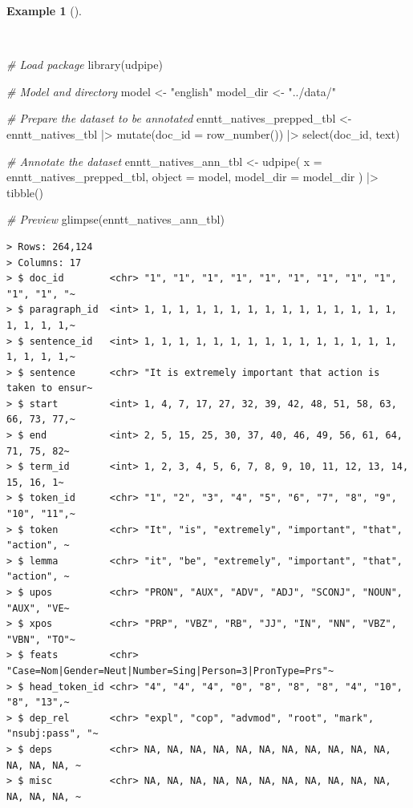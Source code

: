 \documentclass[
  letterpaper,
  DIV=11,
  numbers=noendperiod]{scrreprt}
\newenvironment{Shaded}{\begin{snugshade}}{\end{snugshade}}
\newcommand{\AttributeTok}[1]{\textcolor[rgb]{0.00,0.00,0.00}{#1}}
\newcommand{\CommentTok}[1]{\textcolor[rgb]{0.00,0.00,0.00}{\textit{#1}}}
\newcommand{\FunctionTok}[1]{\textcolor[rgb]{0.00,0.00,0.00}{#1}}
\newcommand{\NormalTok}[1]{\textcolor[rgb]{0.00,0.00,0.00}{#1}}
\newcommand{\OtherTok}[1]{\textcolor[rgb]{0.00,0.00,0.00}{#1}}
\newcommand{\SpecialCharTok}[1]{\textcolor[rgb]{0.00,0.00,0.00}{#1}}
\newcommand{\StringTok}[1]{\textcolor[rgb]{0.00,0.00,0.00}{#1}}
\theoremstyle{definition}
\newtheorem{example}{Example}[chapter]
\theoremstyle{remark}
\begin{document}
\begin{example}[]\protect\hypertarget{exm-td-generation-udpipe-natives}{}\label{exm-td-generation-udpipe-natives}

~

\begin{Shaded}
\begin{Highlighting}[]
\CommentTok{\# Load package}
\FunctionTok{library}\NormalTok{(udpipe)}

\CommentTok{\# Model and directory}
\NormalTok{model }\OtherTok{\textless{}{-}} \StringTok{"english"}
\NormalTok{model\_dir }\OtherTok{\textless{}{-}} \StringTok{"../data/"}

\CommentTok{\# Prepare the dataset to be annotated}
\NormalTok{enntt\_natives\_prepped\_tbl }\OtherTok{\textless{}{-}}
\NormalTok{  enntt\_natives\_tbl }\SpecialCharTok{|\textgreater{}}
  \FunctionTok{mutate}\NormalTok{(}\AttributeTok{doc\_id =} \FunctionTok{row\_number}\NormalTok{()) }\SpecialCharTok{|\textgreater{}}
  \FunctionTok{select}\NormalTok{(doc\_id, text)}

\CommentTok{\# Annotate the dataset}
\NormalTok{enntt\_natives\_ann\_tbl }\OtherTok{\textless{}{-}}
  \FunctionTok{udpipe}\NormalTok{(}
    \AttributeTok{x =}\NormalTok{ enntt\_natives\_prepped\_tbl,}
    \AttributeTok{object =}\NormalTok{ model,}
    \AttributeTok{model\_dir =}\NormalTok{ model\_dir}
\NormalTok{  ) }\SpecialCharTok{|\textgreater{}}
  \FunctionTok{tibble}\NormalTok{()}

\CommentTok{\# Preview}
\FunctionTok{glimpse}\NormalTok{(enntt\_natives\_ann\_tbl)}
\end{Highlighting}
\end{Shaded}

\begin{verbatim}
> Rows: 264,124
> Columns: 17
> $ doc_id        <chr> "1", "1", "1", "1", "1", "1", "1", "1", "1", "1", "1", "~
> $ paragraph_id  <int> 1, 1, 1, 1, 1, 1, 1, 1, 1, 1, 1, 1, 1, 1, 1, 1, 1, 1, 1,~
> $ sentence_id   <int> 1, 1, 1, 1, 1, 1, 1, 1, 1, 1, 1, 1, 1, 1, 1, 1, 1, 1, 1,~
> $ sentence      <chr> "It is extremely important that action is taken to ensur~
> $ start         <int> 1, 4, 7, 17, 27, 32, 39, 42, 48, 51, 58, 63, 66, 73, 77,~
> $ end           <int> 2, 5, 15, 25, 30, 37, 40, 46, 49, 56, 61, 64, 71, 75, 82~
> $ term_id       <int> 1, 2, 3, 4, 5, 6, 7, 8, 9, 10, 11, 12, 13, 14, 15, 16, 1~
> $ token_id      <chr> "1", "2", "3", "4", "5", "6", "7", "8", "9", "10", "11",~
> $ token         <chr> "It", "is", "extremely", "important", "that", "action", ~
> $ lemma         <chr> "it", "be", "extremely", "important", "that", "action", ~
> $ upos          <chr> "PRON", "AUX", "ADV", "ADJ", "SCONJ", "NOUN", "AUX", "VE~
> $ xpos          <chr> "PRP", "VBZ", "RB", "JJ", "IN", "NN", "VBZ", "VBN", "TO"~
> $ feats         <chr> "Case=Nom|Gender=Neut|Number=Sing|Person=3|PronType=Prs"~
> $ head_token_id <chr> "4", "4", "4", "0", "8", "8", "8", "4", "10", "8", "13",~
> $ dep_rel       <chr> "expl", "cop", "advmod", "root", "mark", "nsubj:pass", "~
> $ deps          <chr> NA, NA, NA, NA, NA, NA, NA, NA, NA, NA, NA, NA, NA, NA, ~
> $ misc          <chr> NA, NA, NA, NA, NA, NA, NA, NA, NA, NA, NA, NA, NA, NA, ~
\end{verbatim}


\end{example}
\end{document}
